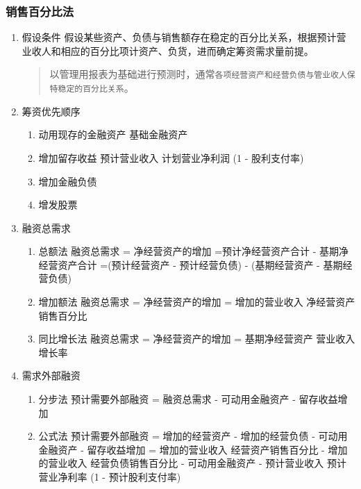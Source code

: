 \documentclass[11pt]{article}
\begin{document}
\subsubsection{销售百分比法}
\label{sec:org4ce6417}
\begin{enumerate}
\item 假设条件
\label{sec:org59fa529}
假设某些资产、负债与销售额存在稳定的百分比关系，根据预计营业收人和相应的百分比项计资产、负货，进而确定筹资需求量前提。
\begin{quote}
以管理用报表为基础进行预测时，通常\texttt{各项经营资产和经营负债与管业收人保特稳定的百分比关系}。
\end{quote}
\item 筹资优先顺序
\label{sec:org2696646}
\begin{enumerate}
\item 动用现存的金融资产
基础金融资产
\item 增加留存收益
预计营业收入 \texttimes{} 计划营业净利润 \texttimes{} (1 - 股利支付率)
\item 增加金融负债
\item 增发股票
\end{enumerate}
\item 融资总需求
\label{sec:org58b3115}
\begin{enumerate}
\item 总额法
\label{sec:orgc588620}
融资总需求 = 净经营资产的增加
=预计净经营资产合计 - 基期净经营资产合计
=(预计经营资产 - 预计经营负债) - (基期经营资产 - 基期经营负债)
\item 增加额法
\label{sec:orgb2e1523}
融资总需求 = 净经营资产的增加
= 增加的营业收入 \texttimes{} 净经营资产销售百分比
\item 同比增长法
\label{sec:org12e6f9c}
融资总需求 = 净经营资产的增加
= 基期净经营资产 \texttimes{} 营业收入增长率
\end{enumerate}
\item 需求外部融资
\label{sec:org2d942c3}
\begin{enumerate}
\item 分步法
\label{sec:org265cb0b}
预计需要外部融资 = 融资总需求 - 可动用金融资产 - 留存收益增加
\item 公式法
\label{sec:org0d229a4}
预计需要外部融资
= 增加的经营资产 - 增加的经营负债 - 可动用金融资产 - 留存收益增加
= 增加的营业收入 \texttimes{} 经营资产销售百分比 - 增加的营业收入 \texttimes{} 经营负债销售百分比 - 可动用金融资产 - 预计营业收入 \texttimes{} 预计营业净利率 \texttimes{} (1 - 预计股利支付率)
\end{enumerate}
\end{enumerate}
\end{document}
